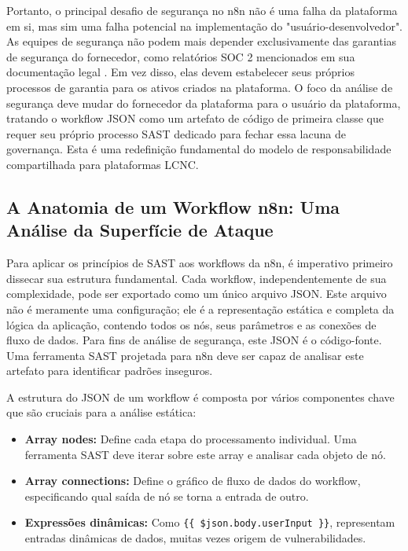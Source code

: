 \documentclass{sftex}
\begin{document}
Portanto, o principal desafio de segurança no n8n não é uma falha da plataforma em si, mas sim uma falha potencial na implementação do "usuário-desenvolvedor". As equipes de segurança não podem mais depender exclusivamente das garantias de segurança do fornecedor, como relatórios SOC 2 mencionados em sua documentação legal \cite{n8n_legal}. Em vez disso, elas devem estabelecer seus próprios processos de garantia para os ativos criados na plataforma. O foco da análise de segurança deve mudar do fornecedor da plataforma para o usuário da plataforma, tratando o workflow JSON como um artefato de código de primeira classe que requer seu próprio processo SAST dedicado para fechar essa lacuna de governança. Esta é uma redefinição fundamental do modelo de responsabilidade compartilhada para plataformas LCNC.

\subsection{A Anatomia de um Workflow n8n: Uma Análise da Superfície de Ataque}

Para aplicar os princípios de SAST aos workflows da n8n, é imperativo primeiro dissecar sua estrutura fundamental. Cada workflow, independentemente de sua complexidade, pode ser exportado como um único arquivo JSON. Este arquivo não é meramente uma configuração; ele é a representação estática e completa da lógica da aplicação, contendo todos os nós, seus parâmetros e as conexões de fluxo de dados. Para fins de análise de segurança, este JSON é o código-fonte. Uma ferramenta SAST projetada para n8n deve ser capaz de analisar este artefato para identificar padrões inseguros.

A estrutura do JSON de um workflow é composta por vários componentes chave que são cruciais para a análise estática:

\begin{itemize}
  \item \textbf{Array nodes:} Define cada etapa do processamento individual. Uma ferramenta SAST deve iterar sobre este array e analisar cada objeto de nó.
  \item \textbf{Array connections:} Define o gráfico de fluxo de dados do workflow, especificando qual saída de nó se torna a entrada de outro.
  \item \textbf{Expressões dinâmicas:} Como \texttt{\{\{ \$json.body.userInput \}\}}, representam entradas dinâmicas de dados, muitas vezes origem de vulnerabilidades.
\end{itemize}
\end{document}
